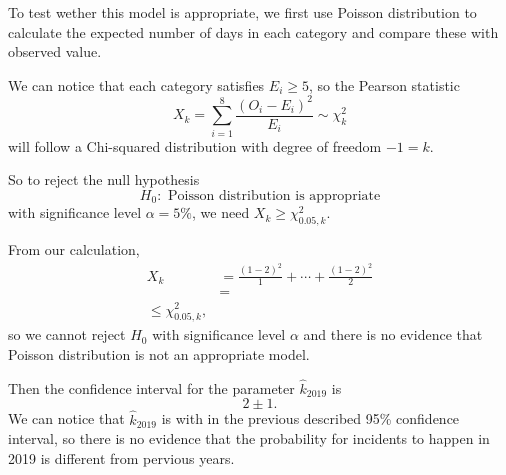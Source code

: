 \documentclass[11pt,a4paper,english]{article}
\begin{document}
To test wether this model is appropriate, we first use Poisson distribution to calculate the expected number of days in each category and compare these with observed value.

We can notice that each category satisfies $E_{i} \geq 5$, so the Pearson statistic 
\begin{equation*}
X_{k} = \sum_{i = 1}^{8}\frac{(O_{i}-E_{i})^{2}}{E_{i}} \sim \chi^{2}_{k}
\end{equation*}
will follow a Chi-squared distribution with degree of freedom $-1 = k$.

So to reject the null hypothesis 
\begin{equation*}
	H_{0}:\text{ Poisson distribution is appropriate}
\end{equation*}
with significance level $\alpha = 5\%$, we need $X_{k} \geq \chi^{2}_{0.05,k}$.

From our calculation,
\begin{align*}
	X_{k} &= \frac{(1-2)^{2}}{1}+\cdots+\frac{(1-2)^{2}}{2}\\
	&= \\ \leq \chi^{2}_{0.05,k},
\end{align*}
so we cannot reject $H_{0}$ with significance level $\alpha$ and there is no evidence that Poisson distribution is not an appropriate model.

Then the confidence interval for the parameter $\hat{k}_{2019}$ is 
\begin{equation*}
	2 \pm 1.
\end{equation*}
We can notice that $\hat{k}_{2019}$ is with in the previous described 95\% confidence interval, so there is no evidence that the probability for incidents to happen in 2019 is different from pervious years. 
\end{document}
